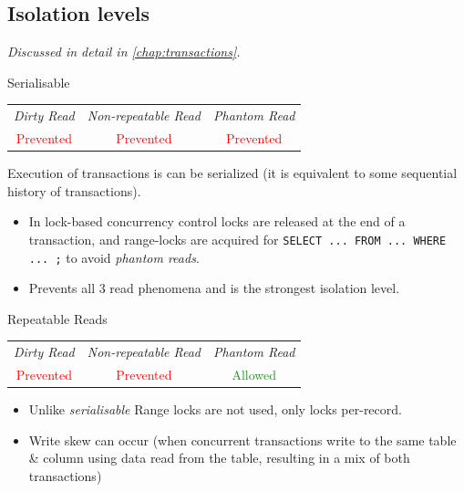\subsection{Isolation levels}
\textit{Discussed in detail in \autoref{chap:transactions}.}
\begin{definitionbox}{Serialisable}
    \begin{center}
        \begin{tabular}{c | c | c}
            \textit{Dirty Read}        & \textit{Non-repeatable Read} & \textit{{Phantom Read}}    \\
            \textcolor{red}{Prevented} & \textcolor{red}{Prevented}   & \textcolor{red}{Prevented} \\
        \end{tabular}
    \end{center}
    Execution of transactions is can be serialized (it is equivalent to some sequential history of transactions).
    \begin{itemize}
        \item In lock-based concurrency control locks are released at the end of a transaction, and range-locks are acquired for \texttt{SELECT ... FROM ... WHERE ... ;} to avoid \textit{phantom reads}.
        \item Prevents all 3 read phenomena and is the strongest isolation level.
    \end{itemize}
\end{definitionbox}
\begin{definitionbox}{Repeatable Reads}
    \begin{center}
        \begin{tabular}{c | c | c}
            \textit{Dirty Read}        & \textit{Non-repeatable Read} & \textit{{Phantom Read}}          \\
            \textcolor{red}{Prevented} & \textcolor{red}{Prevented}   & \textcolor{ForestGreen}{Allowed} \\
        \end{tabular}
    \end{center}
    \begin{itemize}
        \item Unlike \textit{serialisable} Range locks are not used, only locks per-record.
        \item Write skew can occur (when concurrent transactions write to the same table \& column using data read from the table, resulting in a mix of both transactions)
    \end{itemize}
\end{definitionbox}
